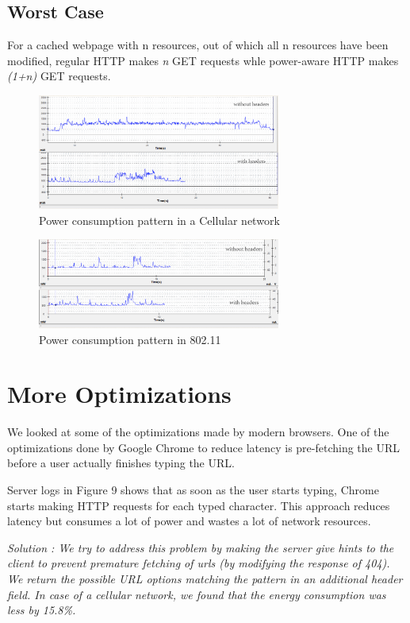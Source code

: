 \documentclass{sigplanconf}
\begin{document}
\subsection{Worst Case}

For a cached webpage with n resources, out of which all n resources have been modified, regular HTTP makes {\it n} GET requests whle power-aware HTTP makes {\it (1+n)} GET requests.

\begin{figure}[ht!]
\centering
\includegraphics[width=80mm]{Cellular_combined.png}
\caption{Power consumption pattern in a Cellular network }
\label{fig:sp_gd_mnist}
\end{figure}

\begin{figure}[ht!]	
\centering
\includegraphics[width=80mm]{Wifi_combined.png}
\caption{Power consumption pattern in 802.11}
\label{fig:sp_gd_mnist}
\end{figure}


\section{More Optimizations}

We looked at some of the optimizations made by modern browsers. One of the optimizations done by Google Chrome to reduce latency is pre-fetching the URL before a user actually finishes typing the URL.
 
Server logs in Figure 9 shows that as soon as the user starts typing, Chrome starts making HTTP requests for each typed character. This approach reduces latency but consumes a lot of power and wastes a lot of network resources. 

\it{Solution} \rm: We try to address this problem by making the server give hints to the client to prevent premature fetching of urls (by modifying the response of 404). We return the possible URL options matching the pattern in an additional header field. In case of a cellular network, we found that the energy consumption was less by 15.8\%.
\end{document}
